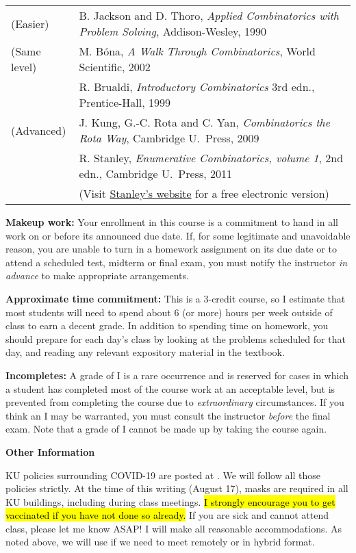 \documentclass{amsart}
\newcommand{\Blue}{\color{blue}}
\newcommand{\Red}{\color{red}}
\newcommand{\hreftext}[2]{\href{#1}{\Blue{#2}}}
\newcommand{\hrefurl}[2]{\href{#1}{\Blue{\textsf{#2}}}}
\newcommand{\padup}{\rule{0mm}{5mm}}
\newcommand{\yell}[1]{\textbf{\LARGE #1}}
\begin{document}
\begin{tabular}{ll}
(Easier) & B. Jackson and D. Thoro, \emph{Applied Combinatorics with Problem Solving}, Addison-Wesley, 1990\\
(Same level) & M. B\'ona, \emph{A Walk Through Combinatorics}, World Scientific, 2002\padup\\
& R. Brualdi, \emph{Introductory Combinatorics} 3rd edn., Prentice-Hall, 1999\\
(Advanced) & J. Kung, G.-C. Rota and C. Yan, \emph{Combinatorics the Rota Way}, Cambridge U.\ Press, 2009\padup\\
& R. Stanley, \emph{Enumerative Combinatorics, volume 1}, 2nd edn., Cambridge U.\ Press, 2011\\
& (Visit \href{http://www-math.mit.edu/~rstan/ec/ec1/}{\Blue Stanley's website} for a free electronic version)
\end{tabular}

\textbf{Makeup work:}
  Your enrollment in this course is a commitment to hand in all work on or before its announced due date.  If, for some legitimate and unavoidable reason, you are unable to turn in a homework assignment on its due date or to attend a scheduled test, midterm or final exam, you must notify the instructor \emph{in advance} to make appropriate arrangements.

\textbf{Approximate time commitment:}
  This is a 3-credit course, so I estimate that most students will need to spend about 6 (or more) hours per week outside of class to earn a decent grade.  In addition to spending time on homework, you should prepare for each day's class by looking at the problems scheduled for that day, and reading any relevant expository material in the textbook.

\textbf{Incompletes:}
  A grade of I is a rare occurrence and is reserved for cases in which a student has completed most of the course work at an acceptable level, but is prevented from completing the course due to \emph{extraordinary} circumstances.  If you think an I may be warranted, you must consult the instructor \emph{before} the final exam.  Note that a grade of I cannot be made up by taking the course again.

\yell{Other Information}

\textbf{\Red{COVID-19:}}
 KU policies surrounding COVID-19 are posted at \hrefurl{https://protect.ku.edu}{protect.ku.edu}.  We will follow all those policies strictly.  At the time of this writing (August 17), masks are required in all KU buildings, including during class meetings. \hl{I strongly encourage you to get vaccinated if you have not done so already.} If you are sick and cannot attend class, please let me know ASAP!  I will make all reasonable accommodations. As noted above, we will use \hreftext{https://gather.town/invite?token=DlEM1vtI}{Gather} if we need to meet remotely or in hybrid format.
\end{document}
